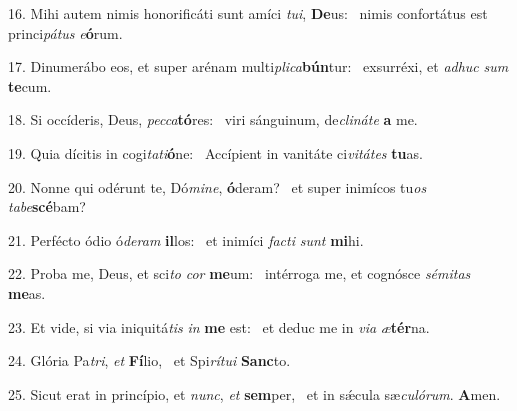16. Mihi autem nimis honorificáti sunt amíci \textit{tu}\textit{i}, \textbf{De}us: \ast\  nimis confortátus est princi\textit{pá}\textit{tus} \textit{e}\textbf{ó}rum.\

17. Dinumerábo eos, et super arénam multi\textit{pli}\textit{ca}\textbf{bún}tur: \ast\  exsurréxi, et \textit{ad}\textit{huc} \textit{sum} \textbf{te}cum.\

18. Si occíderis, Deus, \textit{pec}\textit{ca}\textbf{tó}res: \ast\  viri sánguinum, de\textit{cli}\textit{ná}\textit{te} \textbf{a} me.\

19. Quia dícitis in cogi\textit{ta}\textit{ti}\textbf{ó}ne: \ast\  Accípient in vanitáte ci\textit{vi}\textit{tá}\textit{tes} \textbf{tu}as.\

20. Nonne qui odérunt te, Dó\textit{mi}\textit{ne}, \textbf{ó}deram? \ast\  et super inimícos tu\textit{os} \textit{ta}\textit{be}\textbf{scé}bam?\

21. Perfécto ódio ó\textit{de}\textit{ram} \textbf{il}los: \ast\  et inimíci \textit{fac}\textit{ti} \textit{sunt} \textbf{mi}hi.\

22. Proba me, Deus, et sci\textit{to} \textit{cor} \textbf{me}um: \ast\  intérroga me, et cognósce \textit{sé}\textit{mi}\textit{tas} \textbf{me}as.\

23. Et vide, si via iniquitá\textit{tis} \textit{in} \textbf{me} est: \ast\  et deduc me in \textit{vi}\textit{a} \textit{æ}\textbf{tér}na.\

24. Glória Pa\textit{tri}, \textit{et} \textbf{Fí}lio, \ast\  et Spi\textit{rí}\textit{tu}\textit{i} \textbf{Sanc}to.\

25. Sicut erat in princípio, et \textit{nunc}, \textit{et} \textbf{sem}per, \ast\  et in sǽcula sæ\textit{cu}\textit{ló}\textit{rum}. \textbf{A}men.\


